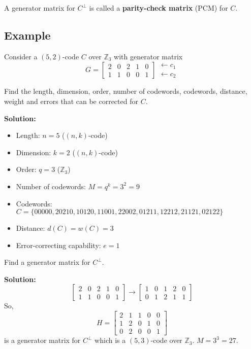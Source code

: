 \begin{defbox}
    \begin{definition}
    A generator matrix for $ C^{\perp} $ is called a \textbf{parity-check matrix}
    (PCM) for $ C $.
\end{definition} \end{defbox}

\begin{exbox}
    \subsection{Example}
    Consider a $ (5,2) $-code $ C $ over $ \mathbb{Z}_3 $ with generator matrix
    \[ G=
    \begin{bmatrix}
        2 & 0 & 2 & 1 & 0\\
        1 & 1 & 0 & 0 & 1
    \end{bmatrix}
    \begin{matrix}
        \leftarrow c_1\\
        \leftarrow c_2
    \end{matrix} \]

    Find the length, dimension, order, number of codewords, codewords,
    distance, weight and errors that can be corrected for $ C $.

    \textbf{Solution:}
    \begin{itemize}
        \item Length: $ n=5 $ ($ (n,k) $-code)
        \item Dimension: $ k=2 $ ($ (n,k) $-code)
        \item Order: $ q=3 $ ($ \mathbb{Z}_3 $)
        \item Number of codewords: $ M=q^k=3^2=9 $
        \item Codewords: $ C=\{00000,20210,10120,11001,22002,01211,12212,21121,02122\} $
        \item Distance: $ d(C)=w(C)=3 $
        \item Error-correcting capability: $ e=1 $
    \end{itemize}
    
    Find a generator matrix for $ C^{\perp} $.

    \textbf{Solution:}
    \[\begin{bmatrix}
        2 & 0 & 2 & 1 & 0\\
        1 & 1 & 0 & 0 & 1
    \end{bmatrix}\rightarrow
    \begin{bmatrix}
        1 & 0 & 1 & 2 & 0\\
        0 & 1 & 2 & 1 & 1
    \end{bmatrix}\]
    So,
    \[ H=
    \left[\begin{array}{cc|ccc}
        2 & 1 & 1 & 0 & 0\\
        1 & 2 & 0 & 1 & 0\\
        0 & 2 & 0 & 0 & 1
    \end{array}\right] \]
    is a generator matrix for $ C^{\perp} $ which is a $ (5,3) $-code
    over $ \mathbb{Z}_3 $. $ M=3^3=27 $.
\end{exbox}